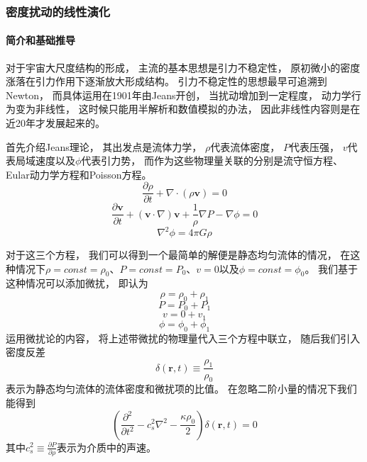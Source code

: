 \documentclass[8pt]{beamer}
\begin{document}
        \begin{frame}[fragile]
            \frametitle{密度扰动的线性演化}
            \framesubtitle{简介和基础推导}
            \begin{multicols}{2} 
                \qquad
                对于宇宙大尺度结构的形成，
                主流的基本思想是引力不稳定性，
                原初微小的密度涨落在引力作用下逐渐放大形成结构。
                引力不稳定性的思想最早可追溯到Newton，
                而具体运用在1901年由Jeans开创，
                当扰动增加到一定程度，
                动力学行为变为非线性，
                这时候只能用半解析和数值模拟的办法，
                因此非线性内容则是在近20年才发展起来的。

                \qquad
                首先介绍Jeans理论，
                其出发点是流体力学，
                $\rho$代表流体密度，
                $P$代表压强，
                $v$代表局域速度以及$\phi$代表引力势，
                而作为这些物理量关联的分别是流守恒方程、Eular动力学方程和Poisson方程。
                $$\frac{\partial\rho}{\partial t}+\nabla\cdot (\rho\textbf{v})=0$$
                $$\frac{\partial \textbf{v}}{\partial t}+(\textbf{v}\cdot\nabla)\textbf{v}+\frac{1}{\rho}\nabla P-\nabla\phi=0$$
                $$\nabla^2\phi=4\pi G\rho$$
                
                \qquad
                对于这三个方程，
                我们可以得到一个最简单的解便是静态均匀流体的情况，
                在这种情况下$\rho=const=\rho_0$、$P=const=P_0$、$v=0$以及$\phi=const=\phi_0$。
                我们基于这种情况可以添加微扰，
                即认为
                $$\rho=\rho_0+\rho_1$$
                $$P=P_0+P_1$$
                $$v=0+v_1$$
                $$\phi=\phi_0+\phi_1$$
                运用微扰论的内容，
                将上述带微扰的物理量代入三个方程中联立，
                随后我们引入密度反差
                $$\delta(\textbf{r},t)\equiv \frac{\rho_1}{\rho_0}$$
                表示为静态均匀流体的流体密度和微扰项的比值。
                在忽略二阶小量的情况下我们能得到
                $$(\frac{\partial^2}{\partial t^2} -c_s^2\nabla^2-\frac{\kappa\rho_0}{2})\delta(\textbf{r},t)=0 $$
                其中$c_s^2\equiv\frac{\partial P}{\partial \rho}$表示为介质中的声速。

            \end{multicols}
        \end{frame}
\end{document}
